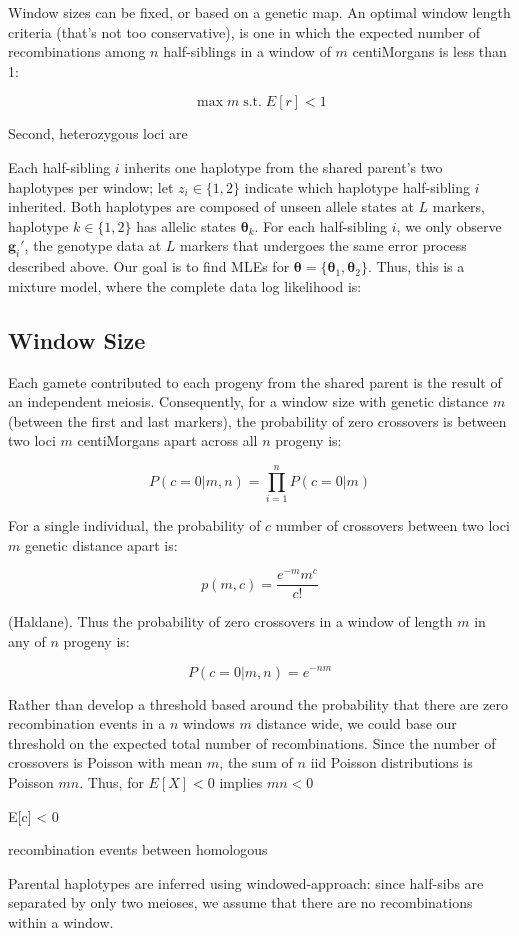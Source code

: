 \documentclass[11pt]{article}
\begin{document}
Window sizes can be fixed, or based on a genetic map. An
optimal window length criteria (that's not too conservative), is one in which
the expected number of recombinations among $n$ half-siblings in a window of
$m$ centiMorgans is less than 1:

$$\max m \; \text{s.t.} \; E[r] < 1$$


Second, heterozygous loci are 


Each half-sibling $i$ inherits one haplotype from the shared parent's two
haplotypes per window; let $z_i \in \{1, 2\}$ indicate which haplotype
half-sibling $i$ inherited. Both haplotypes are composed of unseen allele
states at $L$ markers, haplotype $k \in \{1, 2\}$ has allelic states
$\bm{\theta}_k$. For each half-sibling $i$, we only observe $\bm{g}_i'$, the
genotype data at $L$ markers that undergoes the same error process described
above. Our goal is to find MLEs for $\bm{\theta} = \{\bm{\theta}_1,
\bm{\theta}_2\}$. Thus, this is a mixture model, where the complete data log
likelihood is:

\subsection{Window Size}

Each gamete contributed to each progeny from the shared parent is the
result of an independent meiosis. Consequently, for a window size with genetic
distance $m$ (between the first and last markers), the probability of zero
crossovers is between two loci $m$ centiMorgans apart across all $n$ progeny
is:

$$
P(c = 0 | m, n) = \prod_{i=1}^n P(c = 0 | m)
$$

For a single individual, the probability of $c$ number of crossovers between
two loci $m$ genetic distance apart is:

$$
p(m, c) = \frac{e^{-m}m^c}{c!}
$$

(Haldane). Thus the probability of zero crossovers in a window of length $m$ in
any of $n$ progeny is:

$$
P(c = 0 | m, n) = e^{-nm}
$$

Rather than develop a threshold based around the probability that there are
zero recombination events in a $n$ windows $m$ distance wide, we could base our
threshold on the expected total number of recombinations. Since the number of
crossovers is Poisson with mean $m$, the sum of $n$ iid Poisson distributions
is Poisson $mn$. Thus, for $E[X] < 0$ implies $mn < 0$

E[c] < 0


recombination events
between homologous 



Parental haplotypes are inferred using windowed-approach: since half-sibs are
separated by only two meioses, we assume that there are no recombinations
within a window. 




\end{document}
